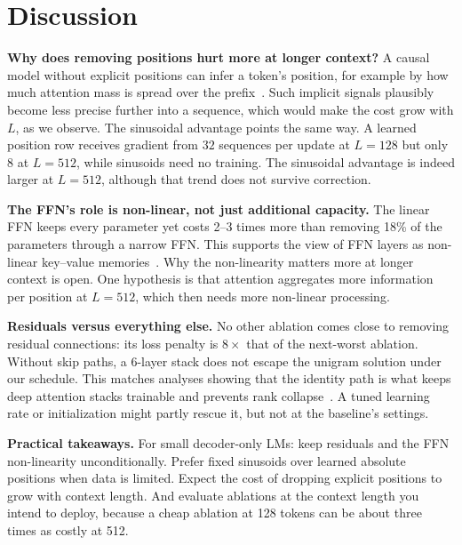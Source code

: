 \documentclass[conference]{IEEEtran}
\begin{document}
\section{Discussion}
\textbf{Why does removing positions hurt more at longer context?} A causal model without explicit
positions can infer a token's position, for example by how much attention mass is spread over the
prefix~\cite{haviv2022transformer}. Such implicit signals plausibly become less precise further
into a sequence, which would make the cost grow with $L$, as we observe. The sinusoidal advantage
points the same way. A learned position row receives gradient from $32$ sequences per update at
$L{=}128$ but only $8$ at $L{=}512$, while sinusoids need no training. The sinusoidal advantage is
indeed larger at $L{=}512$, although that trend does not survive correction.

\textbf{The FFN's role is non-linear, not just additional capacity.} The linear FFN keeps every
parameter yet costs 2--3 times more than removing 18\% of the parameters through a narrow FFN.
This supports the view of FFN layers as non-linear key--value memories~\cite{geva2021transformer}.
Why the non-linearity matters more at longer context is open. One hypothesis is that attention
aggregates more information per position at $L{=}512$, which then needs more non-linear processing.

\textbf{Residuals versus everything else.} No other ablation comes close to removing residual connections: its
loss penalty is $8\times$ that of the next-worst ablation. Without skip paths, a 6-layer stack does not escape the unigram
solution under our schedule. This matches analyses showing that the identity path is what keeps
deep attention stacks trainable and prevents rank collapse~\cite{dong2021attention,he2016deep}.
A tuned learning rate or initialization might partly rescue it, but not at the baseline's settings.

\textbf{Practical takeaways.} For small decoder-only LMs: keep residuals and the FFN non-linearity
unconditionally. Prefer fixed sinusoids over learned absolute positions when data is limited.
Expect the cost of dropping explicit positions to grow with context length. And evaluate
ablations at the context length you intend to deploy, because a cheap ablation at 128 tokens can
be about three times as costly at 512.
\end{document}
